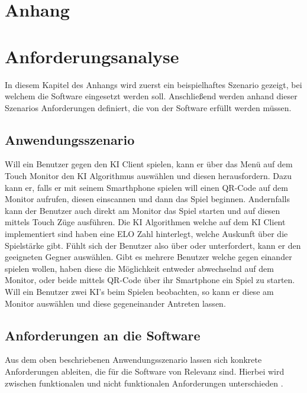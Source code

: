 \documentclass[12pt,a4paper,bibliography=totocnumbered,listof=totocnumbered]{article}
\begin{document}
\begin{appendix}
\section*{Anhang}
{}

\section{Anforderungsanalyse}
\label{apx:Anforderungsanalyse}
In diesem Kapitel des Anhangs wird zuerst ein beispielhaftes Szenario gezeigt, bei welchem die Software eingesetzt werden soll.
Anschließend werden anhand dieser Szenarios Anforderungen definiert, die von der Software erfüllt werden müssen.
\subsection{Anwendungsszenario}
Will ein Benutzer gegen den KI Client spielen, kann er über das Menü auf dem Touch Monitor den KI Algorithmus auswählen und diesen herausfordern.
Dazu kann er, falls er mit seinem Smarthphone spielen will einen QR-Code auf dem Monitor aufrufen, diesen einscannen und dann das Spiel beginnen.
Andernfalls kann der Benutzer auch direkt am Monitor das Spiel starten und auf diesen mittels Touch Züge ausführen.
Die KI Algorithmen welche auf dem KI Client implementiert sind haben eine ELO Zahl hinterlegt, welche Auskunft über die Spielstärke gibt.
Fühlt sich der Benutzer also über oder unterfordert, kann er den geeigneten Gegner auswählen. Gibt es mehrere Benutzer welche 
gegen einander spielen wollen, haben diese die Möglichkeit entweder abwechselnd auf dem Monitor, oder beide mittels QR-Code über ihr Smartphone ein Spiel zu starten.
Will ein Benutzer zwei KI's beim Spielen beobachten, so kann er diese am Monitor auswählen und diese gegeneinander Antreten lassen.
\subsection{Anforderungen an die Software}
Aus dem oben beschriebenen Anwendungsszenario lassen sich konkrete Anforderungen ableiten, die für die Software von Relevanz sind.
Hierbei wird zwischen funktionalen und nicht funktionalen Anforderungen unterschieden \cite{RequirementEngenieering}.

\end{appendix}
\end{document}
